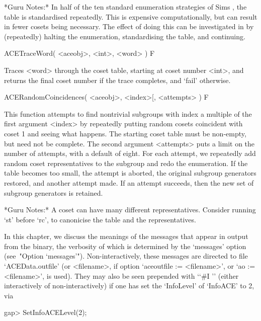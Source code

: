 *Guru Notes:*
In half of the ten standard enumeration strategies of Sims \cite{Sim94},
the   table   is   standardised   repeatedly.    This   is   expensive
computationally, but can result  in fewer cosets being necessary.  The
effect of  doing this  can be investigated  in {\ACE}  by (repeatedly)
halting the enumeration, standardising the table, and continuing.

\>ACETraceWord( <aceobj>, <int>, <word> ) F

Traces <word> through the coset table, starting at coset number <int>,
and returns the final coset number if the trace completes,
and `fail' otherwise.


\>ACERandomCoincidences( <aceobj>, <index>[, <attempts> ) F

This function attempts  to  find  nontrivial subgroups  with  index  a
multiple  of the first  argument <index> by  repeatedly putting  random
cosets
coincident with coset 1 and seeing what happens.  The starting coset
table  must  be non-empty,  but  need  not  be complete.   The  second
argument <attempts> puts  a limit on  the number of  attempts,
with a  default of
eight.    For   each  attempt,   we   repeatedly   add  random   coset
representatives  to the  subgroup and  redo the  enumeration.   If the
table becomes too small, the attempt is aborted, the original subgroup
generators  restored,  and  another   attempt  made.   If  an  attempt
succeeds, then the new set of subgroup generators is retained.

*Guru  Notes:*  A  coset  can  have  many  different  representatives.
Consider running  `st' before  `rc', to canonicise  the table  and the
representatives.

\enditems


In this chapter, we discuss the meanings of the messages  that  appear
in output from the {\ACE} binary, the verbosity of which is determined
by the `messages' option (see~"Option `messages'"). Non-interactively,
these messages are directed to file `ACEData.outfile' (or  <filename>,
if option `aceoutfile := <filename>', or `ao := <filename>', is used).
They  may  also  be  seen  prepended   with   \lq{}`\#I   ''   (either
interactively of non-interactively) if one has set the `InfoLevel'  of
`InfoACE' to 2, via

\beginexample
gap> SetInfoACELevel(2);
\endexample


